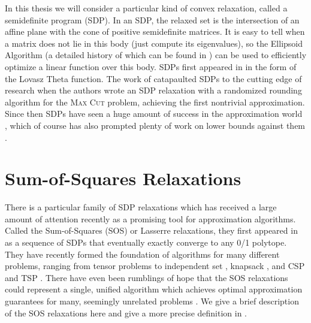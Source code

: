 In this thesis we will consider a particular kind of convex relaxation, called a semidefinite program (SDP). In an SDP, the relaxed set is the intersection of an affine plane with the cone of positive semidefinite matrices. It is easy to tell when a matrix does not lie in this body (just compute its eigenvalues), so the Ellipsoid Algorithm (a detailed history of which can be found in \cite{Akg84}) can be used to efficiently optimize a linear function over this body. SDPs first appeared in \cite{Lovasz79} in the form of the Lovasz Theta function. The work of \cite{GW95} catapaulted SDPs to the cutting edge of research when the authors wrote an SDP relaxation with a randomized rounding algorithm for the \textsc{Max Cut} problem, achieving the first nontrivial approximation. Since then SDPs have seen a huge amount of success in the approximation world \cite{ARV09,TS15,PW07,Kar09,CMM09,Chlam07,FJ97,HZ99,Ragh08}, which of course has also prompted plenty of work on lower bounds against them \cite{BPZ15,LRS15,BCVVZ12,RS09,BDP15}. 


\section{Sum-of-Squares Relaxations}
There is a particular family of SDP relaxations which has received a large amount of attention recently as a promising tool for approximation algorithms. Called the Sum-of-Squares (SOS) or Lasserre relaxations, they first appeared in \cite{Las01} as a sequence of SDPs that eventually exactly converge to any 0/1 polytope. They have recently formed the foundation of algorithms for many different problems, ranging from tensor problems \cite{TS15,PS17,BKS15,HSS15} to independent set \cite{CS08}, knapsack \cite{KMN10}, and \textsc{CSP} and \textsc{TSP} \cite{LRST14,RT12}. There have even been rumblings of hope that the SOS relaxations could represent a single, unified algorithm which achieves optimal approximation guarantees for many, seemingly unrelated problems \cite{BS14}. We give a brief description of the SOS relaxations here and give a more precise definition in . 

